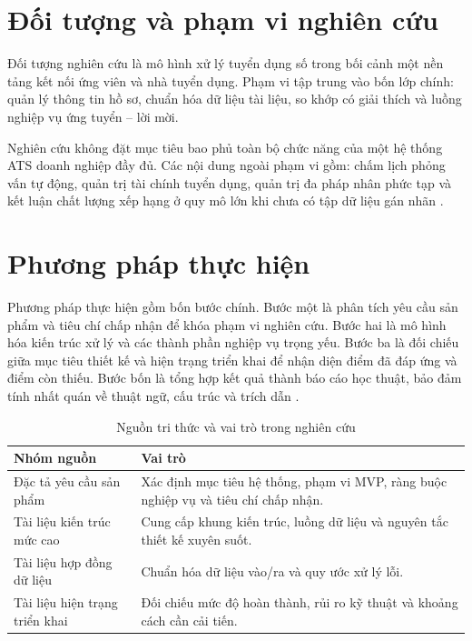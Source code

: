 \section*{Đối tượng và phạm vi nghiên cứu}

Đối tượng nghiên cứu là mô hình xử lý tuyển dụng số trong bối cảnh một nền tảng kết nối ứng viên và nhà tuyển dụng. Phạm vi tập trung vào bốn lớp chính: quản lý thông tin hồ sơ, chuẩn hóa dữ liệu tài liệu, so khớp có giải thích và luồng nghiệp vụ ứng tuyển – lời mời.

Nghiên cứu không đặt mục tiêu bao phủ toàn bộ chức năng của một hệ thống ATS doanh nghiệp đầy đủ. Các nội dung ngoài phạm vi gồm: chấm lịch phỏng vấn tự động, quản trị tài chính tuyển dụng, quản trị đa pháp nhân phức tạp và kết luận chất lượng xếp hạng ở quy mô lớn khi chưa có tập dữ liệu gán nhãn \cite{requirements}.

\section*{Phương pháp thực hiện}

Phương pháp thực hiện gồm bốn bước chính. Bước một là phân tích yêu cầu sản phẩm và tiêu chí chấp nhận để khóa phạm vi nghiên cứu. Bước hai là mô hình hóa kiến trúc xử lý và các thành phần nghiệp vụ trọng yếu. Bước ba là đối chiếu giữa mục tiêu thiết kế và hiện trạng triển khai để nhận diện điểm đã đáp ứng và điểm còn thiếu. Bước bốn là tổng hợp kết quả thành báo cáo học thuật, bảo đảm tính nhất quán về thuật ngữ, cấu trúc và trích dẫn \cite{hld-architecture,implementation-matrix}.

\begin{table}[H]
\caption{Nguồn tri thức và vai trò trong nghiên cứu}
\centering
\begin{tabularx}{\textwidth}{p{}X}
\toprule
\textbf{Nhóm nguồn} & \textbf{Vai trò}\
\\
\midrule
Đặc tả yêu cầu sản phẩm & Xác định mục tiêu hệ thống, phạm vi MVP, ràng buộc nghiệp vụ và tiêu chí chấp nhận.\\
Tài liệu kiến trúc mức cao & Cung cấp khung kiến trúc, luồng dữ liệu và nguyên tắc thiết kế xuyên suốt.\\
Tài liệu hợp đồng dữ liệu & Chuẩn hóa dữ liệu vào/ra và quy ước xử lý lỗi.\\
Tài liệu hiện trạng triển khai & Đối chiếu mức độ hoàn thành, rủi ro kỹ thuật và khoảng cách cần cải tiến.\\
\bottomrule
\end{tabularx}
\end{table}

